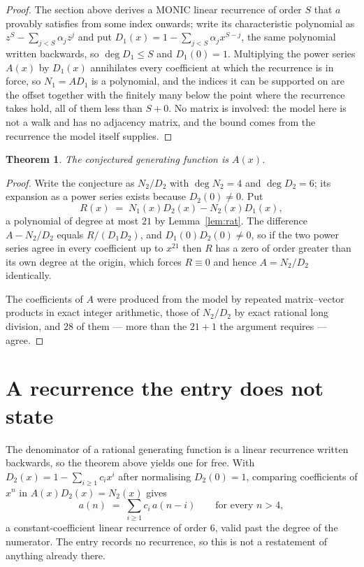 \documentclass[11pt,a4paper]{article}
\theoremstyle{plain}
\newtheorem{theorem}{Theorem}
\theoremstyle{definition}
\begin{document}
\begin{proof}
The section above derives a MONIC linear recurrence of order $S$ that $a$ provably satisfies
from some index onwards; write its characteristic polynomial as $z^S-\sum_{j<S}\alpha_jz^j$
and put $D_1(x)=1-\sum_{j<S}\alpha_jx^{S-j}$, the same polynomial written backwards, so
$\deg D_1\le S$ and $D_1(0)=1$. Multiplying the power series $A(x)$ by $D_1(x)$ annihilates
every coefficient at which the recurrence is in force, so $N_1=AD_1$ is a polynomial, and the
indices it can be supported on are the offset together with the finitely many below the point
where the recurrence takes hold, all of them less than $S+0$. No matrix is involved: the
model here is not a walk and has no adjacency matrix, and the bound comes from the recurrence
the model itself supplies.
\end{proof}

\begin{theorem}
The conjectured generating function is $A(x)$.
\end{theorem}

\begin{proof}
Write the conjecture as $N_2/D_2$ with $\deg N_2=4$ and $\deg D_2=6$; its expansion as a
power series exists because $D_2(0)\neq0$. Put
\[
R(x)\;=\;N_1(x)D_2(x)-N_2(x)D_1(x),
\]
a polynomial of degree at most $21$ by Lemma~\ref{lem:rat}. The difference
$A-N_2/D_2$ equals $R/(D_1D_2)$, and $D_1(0)D_2(0)\neq0$, so if the two power series agree in
every coefficient up to $x^{21}$ then $R$ has a zero of order greater than its own
degree at the origin, which forces $R\equiv0$ and hence $A=N_2/D_2$ identically.

The coefficients of $A$ were produced from the model by repeated matrix--vector products in
exact integer arithmetic, those of $N_2/D_2$ by exact rational long division, and $28$
of them --- more than the $21+1$ the argument requires --- agree.
\end{proof}

\section{A recurrence the entry does not state}

The denominator of a rational generating function is a linear recurrence written backwards, so
the theorem above yields one for free. With $D_2(x)=1-\sum_{i\ge1}c_ix^i$ after normalising
$D_2(0)=1$, comparing coefficients of $x^n$ in $A(x)D_2(x)=N_2(x)$ gives
\[
a(n)\;=\;\sum_{i\ge1}c_i\,a(n-i)\qquad\text{for every }n>4,
\]
a constant-coefficient linear recurrence of order $6$, valid past the degree of the
numerator. The entry records no recurrence, so this is not a restatement of anything
already there.
\end{document}

